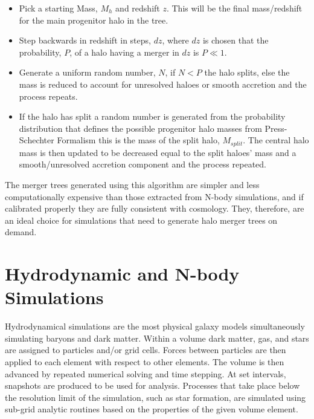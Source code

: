 \begin{itemize}
    \item Pick a starting Mass, $M_{h}$ and redshift $z$. This will be the final mass/redshift for the main progenitor halo in the tree.
    \item Step backwards in redshift in steps, $dz$, where $dz$ is chosen that the probability, $P$, of a halo having a merger in $dz$ is $P\ll1$.
    \item Generate a uniform random number, $N$, if $N<P$ the halo splits, else the mass is reduced to account for unresolved haloes or smooth accretion and the process repeats.
    \item If the halo has split a random number is generated from the probability distribution that defines the possible progenitor halo masses from  Press-Schechter Formalism this is the mass of the split halo, $M_{split}$. The central halo mass is then updated to be decreased equal to the split haloes' mass and a smooth/unresolved accretion component and the process repeated.
\end{itemize}

The merger trees generated using this algorithm are simpler and less computationally expensive than those extracted from N-body simulations, and if calibrated properly they are fully consistent with \LCDM cosmology. They, therefore, are an ideal choice for simulations that need to generate halo merger trees on demand.

\section{Hydrodynamic and N-body Simulations}
\label{sec:Hydro}
Hydrodynamical simulations are the most physical galaxy models simultaneously simulating baryons and dark matter. Within a volume dark matter, gas, and stars are assigned to particles and/or grid cells. Forces between particles are then applied to each element with respect to other elements. The volume is then advanced by repeated numerical solving and time stepping. At set intervals, snapshots are produced to be used for analysis. Processes that take place below the resolution limit of the simulation, such as star formation, are simulated using sub-grid analytic routines based on the properties of the given volume element.

